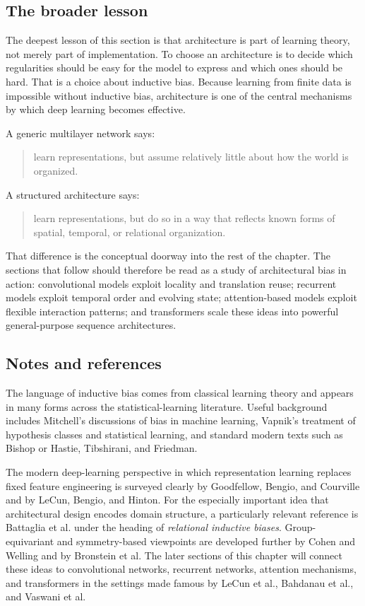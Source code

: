 \subsection*{The broader lesson}

The deepest lesson of this section is that architecture is part of learning theory, not merely part of implementation.
To choose an architecture is to decide which regularities should be easy for the model to express and which ones should be hard.
That is a choice about inductive bias.
Because learning from finite data is impossible without inductive bias, architecture is one of the central mechanisms by which deep learning becomes effective.

\medskip

A generic multilayer network says:
\begin{quote}
learn representations, but assume relatively little about how the world is organized.
\end{quote}
A structured architecture says:
\begin{quote}
learn representations, but do so in a way that reflects known forms of spatial, temporal, or relational organization.
\end{quote}

\medskip

That difference is the conceptual doorway into the rest of the chapter.
The sections that follow should therefore be read as a study of architectural bias in action:
convolutional models exploit locality and translation reuse;
recurrent models exploit temporal order and evolving state;
attention-based models exploit flexible interaction patterns;
and transformers scale these ideas into powerful general-purpose sequence architectures.

\subsection*{Notes and references}

The language of inductive bias comes from classical learning theory and appears in many forms across the statistical-learning literature.
Useful background includes Mitchell's discussions of bias in machine learning,
Vapnik's treatment of hypothesis classes and statistical learning,
and standard modern texts such as Bishop or Hastie, Tibshirani, and Friedman.

\medskip

The modern deep-learning perspective in which representation learning replaces fixed feature engineering is surveyed clearly by Goodfellow, Bengio, and Courville and by LeCun, Bengio, and Hinton.
For the especially important idea that architectural design encodes domain structure, a particularly relevant reference is Battaglia et al.
under the heading of \emph{relational inductive biases}.
Group-equivariant and symmetry-based viewpoints are developed further by Cohen and Welling and by Bronstein et al.
The later sections of this chapter will connect these ideas to convolutional networks, recurrent networks, attention mechanisms, and transformers in the settings made famous by LeCun et al., Bahdanau et al., and Vaswani et al.

